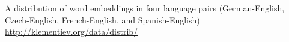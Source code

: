 A distribution of word embeddings in four language pairs (German-English, Czech-English, French-English, and Spanish-English) \url{http://klementiev.org/data/distrib/}

